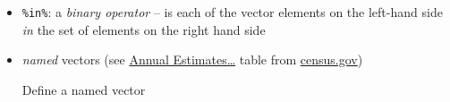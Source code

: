 \documentclass[
]{book}
\newenvironment{Shaded}{\begin{snugshade}}{\end{snugshade}}
\newcommand{\CommentTok}[1]{\textcolor[rgb]{0.56,0.35,0.01}{\textit{#1}}}
\newcommand{\KeywordTok}[1]{\textcolor[rgb]{0.13,0.29,0.53}{\textbf{#1}}}
\newcommand{\NormalTok}[1]{#1}
\newcommand{\OperatorTok}[1]{\textcolor[rgb]{0.81,0.36,0.00}{\textbf{#1}}}
\newcommand{\StringTok}[1]{\textcolor[rgb]{0.31,0.60,0.02}{#1}}
\begin{document}
\begin{itemize}
\item
  \texttt{\%in\%}: a \emph{binary operator} -- is each of the vector elements on the left-hand side \emph{in} the set of elements on the right hand side

\begin{Shaded}
\end{Shaded}
\item
  \emph{named} vectors (see \href{https://www2.census.gov/programs-surveys/popest/tables/2010-2019/state/totals/nst-est2019-01.xlsx}{Annual Estimates\ldots{}} table from \href{https://www.census.gov/data/datasets/time-series/demo/popest/2010s-state-total.html}{census.gov})

  Define a named vector


\end{itemize}
\end{document}
